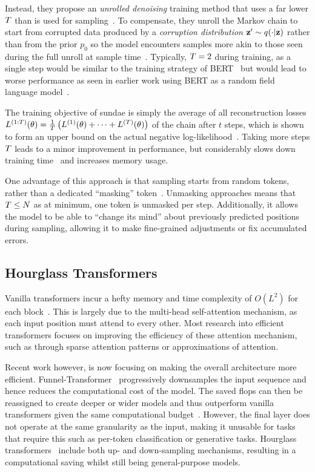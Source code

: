 Instead, they propose an \textit{unrolled denoising} training method that uses a
far lower $T$ than is used for
sampling~\cite{savinov2022stepunrolled}. To compensate, they unroll the Markov
chain to start from corrupted data produced by a \textit{corruption
distribution} $\mathbf{z}' \sim q(\cdot \vert \mathbf{z})$
rather than from the prior $p_0$ so the model encounters samples more akin to
those seen during the full unroll at sample time~\cite{savinov2022stepunrolled}.
Typically, $T = 2$ during training, as a single step would be similar
to the training strategy of BERT~\cite{devlin2019bert} but would lead to worse
performance as seen in earlier work using BERT as a random field language
model~\cite{wang2019bert}.

The training objective of \gls{sundae} is simply the average of all reconstruction
losses $L^{(1:T)}(\theta) = \frac{1}{T} \left(L^{(1)}(\theta) + \dots +
L^{(T)}(\theta) \right)$ of the chain after $t$ steps, which is shown to form
an upper bound on the actual negative
log-likelihood~\cite{savinov2022stepunrolled}. Taking more steps $T$
leads to a minor improvement in performance, but considerably slows down
training time~\cite{savinov2022stepunrolled} and increases memory usage.

One advantage of this approach is that sampling starts from random tokens,
rather than a dedicated ``masking''
token~\cite{bondtaylor2021unleashing,austin2021structured}. Unmasking approaches
means that $T \leq N$ as at minimum, one token is unmasked per step.
Additionally, it allows the model to be able to ``change its mind'' about
previously predicted positions during sampling, allowing it to make fine-grained
adjustments or fix accumulated errors.

\subsection{Hourglass Transformers}
\label{subsec:hourglass}

Vanilla transformers incur a hefty memory and time complexity of $O(L^2)$ for
each block~\cite{vaswani2017attention}. This is largely due to the multi-head
self-attention mechanism, as each input position must attend to every other.
Most research into efficient transformers focuses on improving the efficiency of
these attention mechanism, such as through sparse attention patterns or
approximations of attention.

Recent work however, is now focusing on making the overall architecture more
efficient. Funnel-Transformer~\cite{dai2020funneltransformer} progressively
downsamples the input sequence and hence reduces the computational cost of the
model. The saved \glspl{flop} can then be reassigned to create deeper or wider models
and thus outperform vanilla transformers given the same computational
budget~\cite{dai2020funneltransformer}. However, the final layer does not
operate at the same granularity as the input, making it unusable for tasks that
require this such as per-token classification or generative tasks. Hourglass
transformers~\cite{nawrot2021hierarchical} include both up- and down-sampling
mechanisms, resulting in a computational saving whilst still being
general-purpose models.
